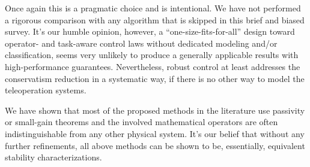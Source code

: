 Once again this is a pragmatic choice and is intentional. We have not performed a rigorous comparison with any algorithm that is 
skipped in this brief and biased survey. It's our humble opinion, however, a ``one-size-fits-for-all'' design 
toward operator- and task-aware control laws without dedicated modeling and/or classification, seems very 
unlikely to produce a generally applicable results with high-performance guarantees. Nevertheless, robust 
control at least addresses the conservatism reduction in a systematic way, if there is no other way to model the 
teleoperation systems.


We have shown that most of the proposed methods in the literature use passivity or small-gain theorems  and 
the involved mathematical operators are often indistinguishable from any other physical system. It's our belief that
without any further refinements, all above methods can be shown to be, essentially, equivalent stability 
characterizations.

